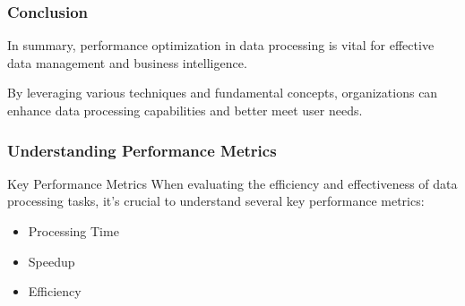 \documentclass[aspectratio=169]{beamer}
\begin{document}
\begin{frame}[fragile]
    \frametitle{Conclusion}
    In summary, performance optimization in data processing is vital for effective data management and business intelligence. 

    By leveraging various techniques and fundamental concepts, organizations can enhance data processing capabilities and better meet user needs.
\end{frame}

\begin{frame}[fragile]
    \frametitle{Understanding Performance Metrics}
    \begin{block}{Key Performance Metrics}
        When evaluating the efficiency and effectiveness of data processing tasks, it's crucial to understand several key performance metrics:
    \end{block}
    \begin{itemize}
        \item Processing Time
        \item Speedup
        \item Efficiency
    \end{itemize}
\end{frame}
\end{document}
